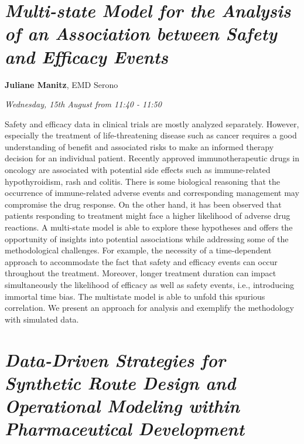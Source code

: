 \documentclass[]{book}
\theoremstyle{definition}
\theoremstyle{definition}
\theoremstyle{definition}
\theoremstyle{remark}
\begin{document}
\hypertarget{multi-state-model-for-the-analysis-of-an-association-between-safety-and-efficacy-events}{%
\section{\texorpdfstring{\emph{Multi-state Model for the Analysis of an
Association between Safety and Efficacy
Events}}{Multi-state Model for the Analysis of an Association between Safety and Efficacy Events}}\label{multi-state-model-for-the-analysis-of-an-association-between-safety-and-efficacy-events}}

\textbf{Juliane Manitz}, EMD Serono

\emph{Wednesday, 15th August from 11:40 - 11:50}

Safety and efficacy data in clinical trials are mostly analyzed
separately. However, especially the treatment of life-threatening
disease such as cancer requires a good understanding of benefit and
associated risks to make an informed therapy decision for an individual
patient. Recently approved immunotherapeutic drugs in oncology are
associated with potential side effects such as immune-related
hypothyroidism, rash and colitis. There is some biological reasoning
that the occurrence of immune-related adverse events and corresponding
management may compromise the drug response. On the other hand, it has
been observed that patients responding to treatment might face a higher
likelihood of adverse drug reactions. A multi-state model is able to
explore these hypotheses and offers the opportunity of insights into
potential associations while addressing some of the methodological
challenges. For example, the necessity of a time-dependent approach to
accommodate the fact that safety and efficacy events can occur
throughout the treatment. Moreover, longer treatment duration can impact
simultaneously the likelihood of efficacy as well as safety events,
i.e., introducing immortal time bias. The multistate model is able to
unfold this spurious correlation. We present an approach for analysis
and exemplify the methodology with simulated data.

\hypertarget{data-driven-strategies-for-synthetic-route-design-and-operational-modeling-within-pharmaceutical-development}{%
\section{\texorpdfstring{\emph{Data-Driven Strategies for Synthetic
Route Design and Operational Modeling within Pharmaceutical
Development}}{Data-Driven Strategies for Synthetic Route Design and Operational Modeling within Pharmaceutical Development}}\label{data-driven-strategies-for-synthetic-route-design-and-operational-modeling-within-pharmaceutical-development}}
\end{document}
